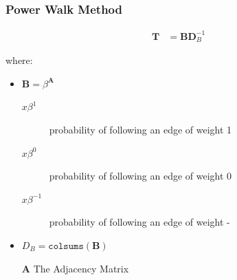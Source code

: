 \documentclass[11pt]{article}
\begin{document}
\subsubsection{Power Walk Method}
\label{sec:org9334651}

\begin{align}
\mathbf{T} &= \mathbf{B} \mathbf{D}^{-1}_{B} \label{eq:pwalk-def}
\end{align}



where:

\begin{itemize}
\item \(\mathbf{B}= \beta^{\mathbf{A}}\)
\begin{description}
\item[{\(x\beta^{1}\) }] probability of following an edge of weight 1
\item[{\(x\beta^{0}\) }] probability of following an edge of weight 0
\item[{\(x\beta^{-1}\)}] probability of following an edge of weight -
\end{description}
\item \(D_{B} = \mathtt{colsums}(\mathbf{B})\)
\item[{\(\mathbf{A}\)}] The Adjacency Matrix
\end{itemize}
\end{document}
